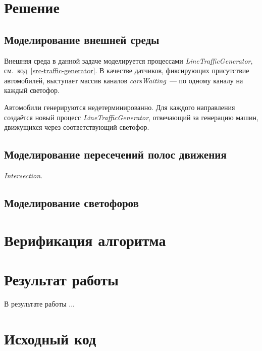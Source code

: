 \documentclass[a4paper,10pt]{article}
\begin{document}
\section{Решение}

\subsection{Моделирование внешней среды}
Внешняя среда в данной задаче моделируется процессами \textit{LineTrafficGenerator}, 
см.~код~\ref{src-traffic-generator}.
В качестве датчиков, фиксирующих присутствие автомобилей, 
выступает массив каналов \textit{carsWaiting}~--- по одному каналу на каждый светофор.

Автомобили генерируются недетерминированно. 
Для каждого направления создаётся новый процесс \textit{LineTrafficGenerator},
отвечающий за генерацию машин, движущихся через соответствующий светофор.



\subsection{Моделирование пересечений полос движения}
\textit{Intersection}.



\subsection{Моделирование светофоров}




\section{Верификация алгоритма}




\section{Результат работы}
В результате работы ...

\pagebreak

\appendix
\section{Исходный код}



\pagebreak



\end{document}
